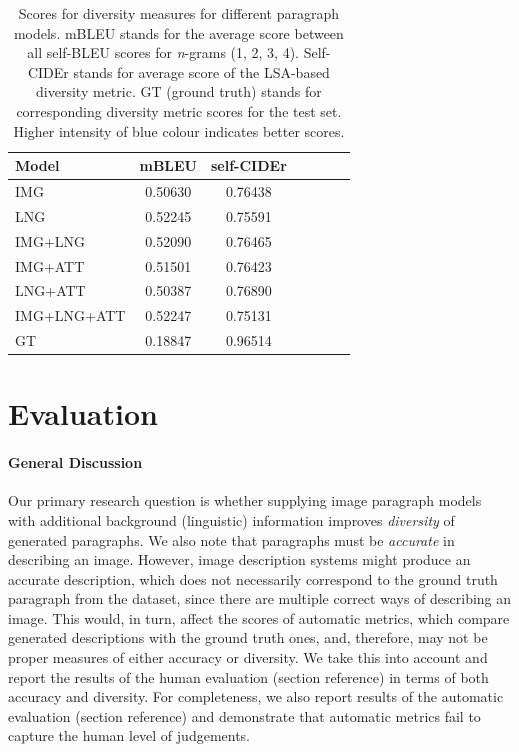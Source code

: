 \documentclass[11pt,a4paper]{article}
\begin{document}
\begin{table}[h]
  \centering
  \begin{tabular}{|l|c|c|c|c|c|c|}
  \hline
    \textbf{Model} & \textbf{mBLEU} & \textbf{self-CIDEr}  \\
  \hline
   IMG & \cellcolor{blue!20}0.50630 & 0.76438 \\
  \hline
   LNG & 0.52245 & 0.75591 \\
  \hline
   IMG+LNG & 0.52090 & \cellcolor{blue!20}0.76465  \\
  \hline
  \hline
   IMG+ATT & \cellcolor{blue!10}0.51501 & \cellcolor{blue!10}0.76423 \\
  \hline
   LNG+ATT & \cellcolor{blue!50}0.50387 & \cellcolor{blue!50}0.76890  \\
  \hline
   IMG+LNG+ATT & 0.52247 & 0.75131 \\
  \hline
  \hline
   GT & 0.18847 & 0.96514 \\
  \hline
  \end{tabular}
  \caption{Scores for diversity measures for different paragraph models. mBLEU stands for the average score between all self-BLEU scores for \textit{n}-grams (1, 2, 3, 4). Self-CIDEr stands for average score of the LSA-based diversity metric. GT (ground truth) stands for corresponding diversity metric scores for the test set. Higher intensity of blue colour indicates better scores.}
  \label{tab:divstats}
\end{table}

\section{Evaluation}

\iffalse
\paragraph{General Discussion}
Our primary research question is whether supplying image paragraph models with additional background (linguistic) information improves \textit{diversity} of generated paragraphs.
We also note that paragraphs must be \textit{accurate} in describing an image.
However, image description systems might produce an accurate description, which does not necessarily correspond to the ground truth paragraph from the dataset, since there are multiple correct ways of describing an image.
This would, in turn, affect the scores of automatic metrics, which compare generated descriptions with the ground truth ones, and, therefore, may not be proper measures of either accuracy or diversity.
We take this into account and report the results of the human evaluation (section reference) in terms of both accuracy and diversity.
For completeness, we also report results of the automatic evaluation (section reference) and demonstrate that automatic metrics fail to capture the human level of judgements.
\end{document}
